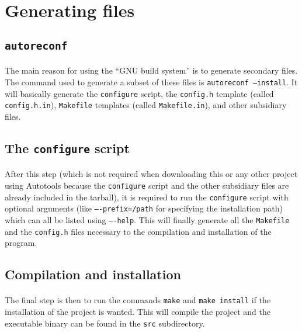 \documentclass{report}
\begin{document}
\section{Generating files}

\subsection{\texttt{autoreconf}}

\paragraph{} The main reason for using the ``GNU build system'' is to generate
secondary files. The command used to generate a subset of these files is
\texttt{autoreconf --install}. It will basically generate the
\texttt{configure} script, the \texttt{config.h} template (called
\texttt{config.h.in}), \texttt{Makefile} templates (called
\texttt{Makefile.in}), and other subsidiary files.

\subsection{The \texttt{configure} script}

\paragraph{} After this step (which is not required when downloading this or
any other project using Autotools because the \texttt{configure} script and the
other subsidiary files are already included in the tarball), it is required to
run the \texttt{configure} script with optional arguments (like
\texttt{----prefix=/path} for specifying the installation path) which can all
be listed using \texttt{----help}. This will finally generate all the
\texttt{Makefile} and the \texttt{config.h} files necessary to the compilation
and installation of the program.

\subsection{Compilation and installation}

\paragraph{} The final step is then to run the commands \texttt{make} and
\texttt{make install} if the installation of the project is wanted. This will
compile the project and the executable binary can be found in the \texttt{src}
subdirectory.
\end{document}
